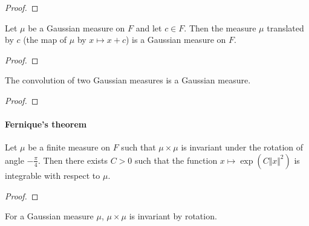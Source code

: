 \begin{proof}\leanok

\end{proof}


\begin{lemma}\label{lem:isGaussian_add_const}
  \leanok
Let $\mu$ be a Gaussian measure on $F$ and let $c \in F$.
Then the measure $\mu$ translated by $c$ (the map of $\mu$ by $x \mapsto x + c$) is a Gaussian measure on $F$.
\end{lemma}

\begin{proof}\leanok

\end{proof}


\begin{lemma}\label{lem:isGaussian_conv}
  \mathlibok
The convolution of two Gaussian measures is a Gaussian measure.
\end{lemma}

\begin{proof}\leanok

\end{proof}



\paragraph{Fernique's theorem}


\begin{theorem}\label{thm:exists_integrable_exp_sq_of_map_rotation_eq_self}
  \leanok
Let $\mu$ be a finite measure on $F$ such that $\mu \times \mu$ is invariant under the rotation of angle $-\frac{\pi}{4}$.
Then there exists $C > 0$ such that the function $x \mapsto \exp (C \Vert x \Vert ^ 2)$ is integrable with respect to $\mu$.
\end{theorem}

\begin{proof}\leanok

\end{proof}


\begin{lemma}\label{lem:IsGaussian.map_rotation_eq_self}
  \leanok
For a Gaussian measure $\mu$, $\mu \times \mu$ is invariant by rotation.
\end{lemma}

